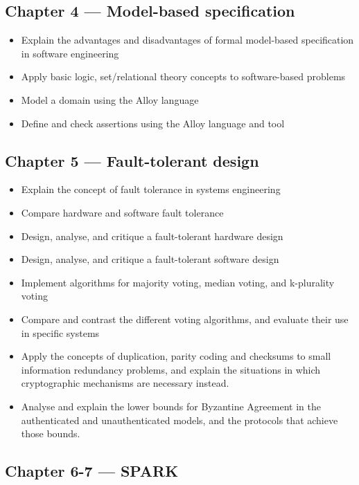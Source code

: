\documentclass[a4paper,11pt]{article}
\begin{document}
\subsection*{Chapter 4 --- Model-based specification}

\begin{itemize}
 \item Explain the advantages and disadvantages of formal model-based specification in software engineering
 \item Apply basic logic, set/relational theory concepts to software-based problems
 \item Model a domain using the Alloy language
 \item Define and check assertions using the Alloy language and tool
\end{itemize}

\subsection*{Chapter 5 --- Fault-tolerant design}

\begin{itemize}
 \item Explain the concept of fault tolerance in systems engineering
 \item Compare hardware and software fault tolerance
 \item Design, analyse, and critique a fault-tolerant hardware design
 \item Design, analyse, and critique a fault-tolerant software design
 \item Implement algorithms for majority voting, median voting, and k-plurality voting
 \item Compare and contrast the different voting algorithms, and evaluate their use in specific systems
 \item Apply the concepts of  duplication, parity coding and checksums to small information redundancy problems, and explain the situations  in which cryptographic mechanisms are necessary instead.
 \item Analyse and explain the lower bounds for Byzantine Agreement in the authenticated and unauthenticated models, and the protocols that achieve those bounds.
\end{itemize}

\subsection*{Chapter 6-7 --- SPARK}
\end{document}
